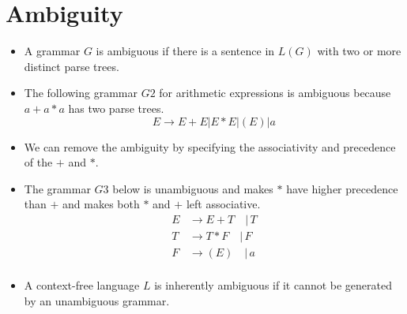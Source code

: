 \documentclass[]{article}
\begin{document}
\section{Ambiguity}
  \begin{itemize}
    \item A grammar $G$ is ambiguous if there is a sentence in $L(G)$ with two
    or more distinct parse trees.
    \item The following grammar $G2$ for arithmetic expressions is ambiguous
    because $a + a * a$ has two parse trees. \\
      \[ E \rightarrow E + E | E * E | (E) | a \]
    \item We can remove the ambiguity by specifying the associativity and
    precedence of the $+$ and $*$.
    \item The grammar $G3$ below is unambiguous and makes $*$ have higher
    precedence than $+$ and makes both $*$ and $+$ left associative.
      \begin{align*}
        E & \rightarrow E + T \quad | \, T \\
        T & \rightarrow T * F \quad | \, F \\
        F & \rightarrow ( E ) \quad | \, a \\
      \end{align*}
    \item A context-free language $L$ is inherently ambiguous if it cannot be 
    generated by an unambiguous grammar.
  \end{itemize}
\end{document}
